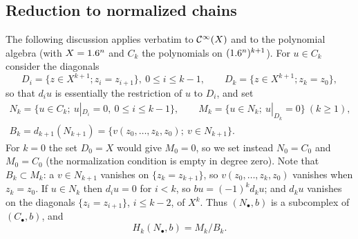 \subsection{Reduction to normalized chains}
The following discussion applies verbatim to $\mathcal{C}^\infty(X)$ and to the polynomial
algebra (with $X=1.6^n$ and $C_k$ the polynomials on $(1.6^n)^{k+1}$). For
$u\in C_k$ consider the diagonals
\begin{equation*}
  D_i=\{z\in X^{k+1};z_i=z_{i+1}\},\ 0\le i\le k-1,\qquad
  D_k=\{z\in X^{k+1};z_k=z_0\},
\end{equation*}
so that $d_iu$ is essentially the restriction of $u$ to $D_i$, and set
\begin{equation*}
\begin{gathered}
  N_k=\{u\in C_k;\ u|_{D_i}=0,\ 0\le i\le k-1\},\qquad
  M_k=\{u\in N_k;\ u|_{D_k}=0\}\ (k\ge1),\\
  B_k=d_{k+1}(N_{k+1})=\{v(z_0,\dots,z_k,z_0);\ v\in N_{k+1}\}.
\end{gathered}
\end{equation*}
For $k=0$ the set $D_0=X$ would give $M_0=0$, so we set instead $N_0=C_0$
and $M_0=C_0$ (the normalization condition is empty in degree zero). Note that
 $B_k\subset M_k$: a $v\in N_{k+1}$ vanishes on
$\{z_k=z_{k+1}\}$, so $v(z_0,\dots,z_k,z_0)$ vanishes when $z_k=z_0$.
If $u\in N_k$ then $d_iu=0$ for $i<k$, so $bu=(-1)^kd_ku$; and $d_ku$ vanishes
on the diagonals $\{z_i=z_{i+1}\}$, $i\le k-2$, of $X^k$. Thus $(N_\bullet,b)$
is a subcomplex of $(C_\bullet,b)$, and
\begin{equation}
  H_k(N_\bullet,b)=M_k/B_k .
  \label{hochschild:eq:HN}
\end{equation}

